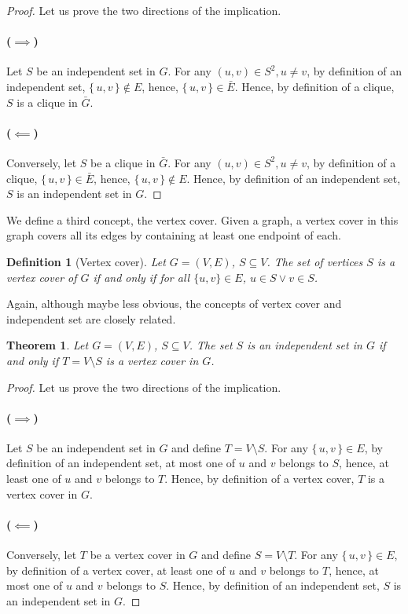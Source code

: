 \documentclass{article}
\newcommand{\theoremname}{Theorem}
\newcommand{\definitionname}{Definition}
\newtheorem{theorem}{\theoremname}
\newtheorem{definition}{\definitionname}
\begin{document}
\begin{proof}
  Let us prove the two directions of the implication.
  \paragraph{($\implies$)}%
  Let $S$ be an independent set in $G$.
  For any $(u,v) \in S^2, u \ne v$, by definition of an independent set,
  $\{\,u,v\,\} \not\in E$, hence, $\{\,u,v\,\} \in \bar{E}$. Hence, by
  definition of a clique, $S$ is a clique in $\bar{G}$.

  \paragraph{($\impliedby$)}%
  Conversely, let $S$ be a clique in $\bar{G}$.
  For any $(u,v) \in S^2, u \ne v$, by definition of a clique,
  $\{\,u,v\,\} \in \bar{E}$, hence, $\{\,u,v\,\} \not\in E$. Hence, by
  definition of an independent set, $S$ is an independent set in $G$.
\end{proof}

We define a third concept, the vertex cover. Given a graph, a vertex cover in
this graph covers all its edges by containing at least one endpoint of each.
\begin{definition}[Vertex cover]
  Let $G=(V,E)$, $S\subseteq V$. The set of vertices $S$ is a vertex cover of
  $G$ if and only if for all $\{u,v\} \in E$, $u \in S \lor v \in S$.
\end{definition}

Again, although maybe less obvious, the concepts of vertex cover and
independent set are closely related.
\begin{theorem}\label{is-vc}
  Let $G = (V,E)$, $S \subseteq V$. The set $S$ is an independent set in $G$ if
  and only if $T = V \setminus S$ is a vertex cover in $G$.
\end{theorem}

\begin{proof}
  Let us prove the two directions of the implication.
  \paragraph{($\implies$)}%
  Let $S$ be an independent set in $G$ and define $T = V \setminus S$.
  For any $\{\,u,v\,\} \in E$, by definition of an independent set, at most one
  of $u$ and $v$ belongs to $S$, hence, at least one of $u$ and $v$ belongs to
  $T$. Hence, by definition of a vertex cover, $T$ is a vertex cover in $G$.

  \paragraph{($\impliedby$)}%
  Conversely, let $T$ be a vertex cover in $G$ and define $S = V \setminus T$.
  For any $\{\,u,v\,\} \in E$, by definition of a vertex cover, at least one
  of $u$ and $v$ belongs to $T$, hence, at most one of $u$ and $v$ belongs to
  $S$. Hence, by definition of an independent set, $S$ is an independent set in
  $G$.
\end{proof}
\end{document}
